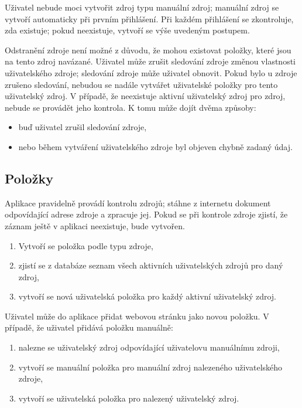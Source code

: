 Uživatel nebude moci vytvořit zdroj typu manuální zdroj; manuální zdroj se vytvoří automaticky při prvním přihlášení.
Při každém přihlášení se zkontroluje, zda existuje; pokud neexistuje, vytvoří se výše uvedeným postupem.

Odstranění zdroje není možné z důvodu, že mohou existovat položky, které jsou na tento zdroj navázané.
Uživatel může zrušit sledování zdroje změnou vlastnosti uživatelského zdroje; sledování zdroje může uživatel obnovit.
Pokud bylo u zdroje zrušeno sledování, nebudou se nadále vytvářet uživatelské položky pro tento uživatelský zdroj.
V případě, že neexistuje aktivní uživatelský zdroj pro zdroj, nebude se provádět jeho kontrola.
K tomu může dojít dvěma způsoby:
\begin{itemize}
	\item buď uživatel zrušil sledování zdroje,
	\item nebo během vytváření uživatelského zdroje byl objeven chybně zadaný údaj.
\end{itemize}

\subsection{Položky}

Aplikace pravidelně provádí kontrolu zdrojů; stáhne z internetu dokument odpovídající adrese zdroje a zpracuje jej.
Pokud se při kontrole zdroje zjistí, že záznam ještě v aplikaci neexistuje, bude vytvořen.
\begin{enumerate}
	\item Vytvoří se položka podle typu zdroje,
	\item zjistí se z databáze seznam všech aktivních uživatelských zdrojů pro daný zdroj,
	\item vytvoří se nová uživatelská položka pro každý aktivní uživatelský zdroj.
\end{enumerate}

Uživatel může do aplikace přidat webovou stránku jako novou položku.
V případě, že uživatel přidává položku manuálně:
\begin{enumerate}
	\item nalezne se uživatelský zdroj odpovídající uživatelovu manuálnímu zdroji,
	\item vytvoří se manuální položka pro manuální zdroj nalezeného uživatelského zdroje,
	\item vytvoří se uživatelská položka pro nalezený uživatelský zdroj.
\end{enumerate}


